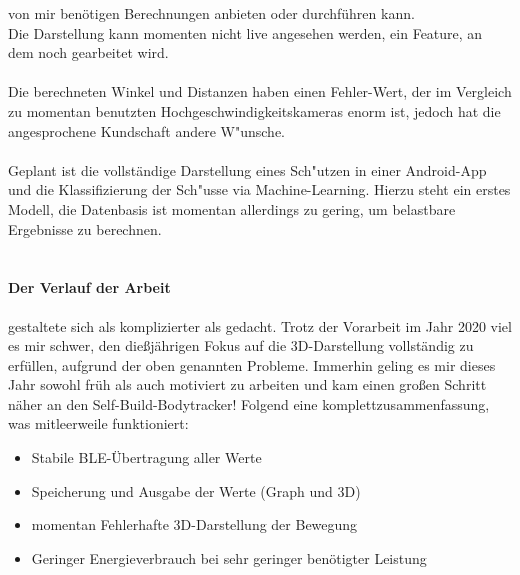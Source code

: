 von mir benötigen Berechnungen anbieten oder durchführen kann.\\
Die Darstellung kann momenten nicht live angesehen werden, ein Feature, an dem noch
gearbeitet wird.\\
\\
Die berechneten Winkel und Distanzen haben einen Fehler-Wert, der im Vergleich
zu momentan benutzten Hochgeschwindigkeitskameras enorm ist, jedoch 
hat die angesprochene Kundschaft andere W"unsche.\\
\\
Geplant ist die vollständige Darstellung eines Sch"utzen in einer Android-App
und die Klassifizierung der Sch"usse via Machine-Learning. Hierzu steht ein erstes Modell,
die Datenbasis ist momentan allerdings zu gering, um belastbare Ergebnisse zu berechnen.\\
\\
\paragraph{Der Verlauf der Arbeit} gestaltete sich als komplizierter als 
gedacht. Trotz der Vorarbeit im Jahr 2020 viel es mir schwer, den dießjährigen Fokus auf die
3D-Darstellung vollständig zu erfüllen, aufgrund der oben genannten Probleme. 
Immerhin geling es mir dieses Jahr sowohl früh als auch motiviert zu arbeiten und kam einen
großen Schritt näher an den Self-Build-Bodytracker! Folgend eine komplettzusammenfassung, 
was mitleerweile funktioniert:
\begin{itemize}
    \item Stabile BLE-Übertragung aller Werte 
    \item Speicherung und Ausgabe der Werte (Graph und 3D)
    \item momentan Fehlerhafte 3D-Darstellung der Bewegung
    \item Geringer Energieverbrauch bei sehr geringer benötigter Leistung 
\end{itemize}